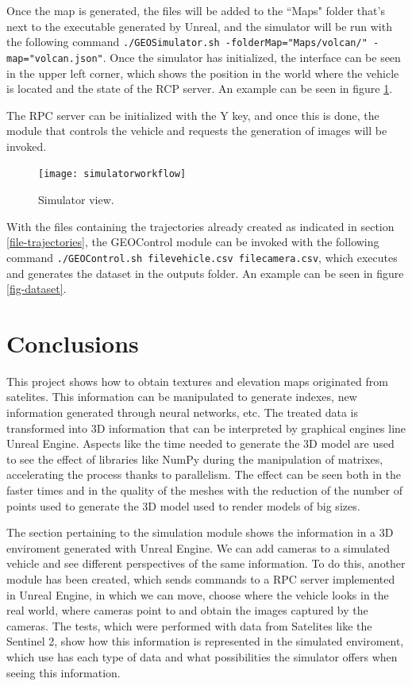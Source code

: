 \documentclass[10pt,a4paper,twocolumn,twoside]{article}
\begin{document}
Once the map is generated, the files will be added to the ``Maps" folder that's next to the executable generated by Unreal, and the simulator will be run with the following command {\tt ./GEOSimulator.sh -folderMap="Maps/volcan/" -map="volcan.json"}. Once the simulator has initialized, the interface can be seen in the upper left corner, which shows the position in the world where the vehicle is located and the state of the RCP server. An example can be seen in figure \ref{fig-workflowsimulator}.

The RPC server can be initialized with the Y key, and once this is done, the module that controls the vehicle and requests the generation of images will be invoked.

\begin{figure}[!h]
\centering
  	\texttt{[image: simulatorworkflow]}
	\caption{Simulator view.}
	\label{fig-workflowsimulator}
\end{figure}

With the files containing the trajectories already created as indicated in section \ref{file-trajectories}, the GEOControl module can be invoked with the following command {\tt ./GEOControl.sh filevehicle.csv filecamera.csv}, which executes and generates the dataset in the outputs folder. An example can be seen in figure \ref{fig-dataset}.

\section{Conclusions}

This project shows how to obtain textures and elevation maps originated from satelites. This information can be manipulated to generate indexes, new information generated through neural networks, etc. The treated data is transformed into 3D information that can be interpreted by graphical engines line Unreal Engine. Aspects like the time needed to generate the 3D model are used to see the effect of libraries like NumPy during the manipulation of matrixes, accelerating the process thanks to parallelism. The effect can be seen both in the faster times and in the quality of the meshes with the reduction of the number of points used to generate the 3D model used to render models of big sizes.

The section pertaining to the simulation module shows the information in a 3D enviroment generated with Unreal Engine. We can add cameras to a simulated vehicle and see different perspectives of the same information. To do this, another module has been created, which sends commands to a RPC server implemented in Unreal Engine, in which we can move, choose where the vehicle looks in the real world, where cameras point to and obtain the images captured by the cameras.
The tests, which were performed with data from Satelites like the Sentinel 2, show how this information is represented in the simulated enviroment, which use has each type of data and what possibilities the simulator offers when seeing this information.
\end{document}
